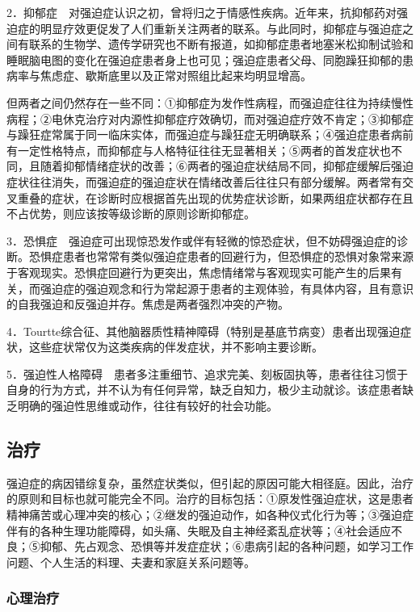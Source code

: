 2．抑郁症　对强迫症认识之初，曾将归之于情感性疾病。近年来，抗抑郁药对强迫症的明显疗效更促发了人们重新关注两者的联系。与此同时，抑郁症与强迫症之间有联系的生物学、遗传学研究也不断有报道，如抑郁症患者地塞米松抑制试验和睡眠脑电图的变化在强迫症患者身上也可见；强迫症患者父母、同胞躁狂抑郁的患病率与焦虑症、歇斯底里以及正常对照组比起来均明显增高。

但两者之间仍然存在一些不同：①抑郁症为发作性病程，而强迫症往往为持续慢性病程；②电休克治疗对内源性抑郁症疗效确切，而对强迫症疗效不肯定；③抑郁症与躁狂症常属于同一临床实体，而强迫症与躁狂症无明确联系；④强迫症患者病前有一定性格特点，而抑郁症与人格特征往往无显著相关；⑤两者的首发症状也不同，且随着抑郁情绪症状的改善；⑥两者的强迫症状结局不同，抑郁症缓解后强迫症状往往消失，而强迫症的强迫症状在情绪改善后往往只有部分缓解。两者常有交叉重叠的症状，在诊断时应根据首先出现的优势症状诊断，如果两组症状都存在且不占优势，则应该按等级诊断的原则诊断抑郁症。

3．恐惧症　强迫症可出现惊恐发作或伴有轻微的惊恐症状，但不妨碍强迫症的诊断。恐惧症患者也常常有类似强迫症患者的回避行为，但恐惧症的恐惧对象常来源于客观现实。恐惧症回避行为更突出，焦虑情绪常与客观现实可能产生的后果有关，而强迫症的强迫观念和行为常起源于患者的主观体验，有具体内容，且有意识的自我强迫和反强迫并存。焦虑是两者强烈冲突的产物。

4．Tourtte综合征、其他脑器质性精神障碍（特别是基底节病变）患者出现强迫症状，这些症状常仅为这类疾病的伴发症状，并不影响主要诊断。

5．强迫性人格障碍　患者多注重细节、追求完美、刻板固执等，患者往往习惯于自身的行为方式，并不认为有任何异常，缺乏自知力，极少主动就诊。该症患者缺乏明确的强迫性思维或动作，往往有较好的社会功能。

\subsection{治疗}

强迫症的病因错综复杂，虽然症状类似，但引起的原因可能大相径庭。因此，治疗的原则和目标也就可能完全不同。治疗的目标包括：①原发性强迫症状，这是患者精神痛苦或心理冲突的核心；②继发的强迫动作，如各种仪式化行为等；③强迫症伴有的各种生理功能障碍，如头痛、失眠及自主神经紊乱症状等；④社会适应不良；⑤抑郁、先占观念、恐惧等并发症症状；⑥患病引起的各种问题，如学习工作问题、个人生活的料理、夫妻和家庭关系问题等。

\subsubsection{心理治疗}

